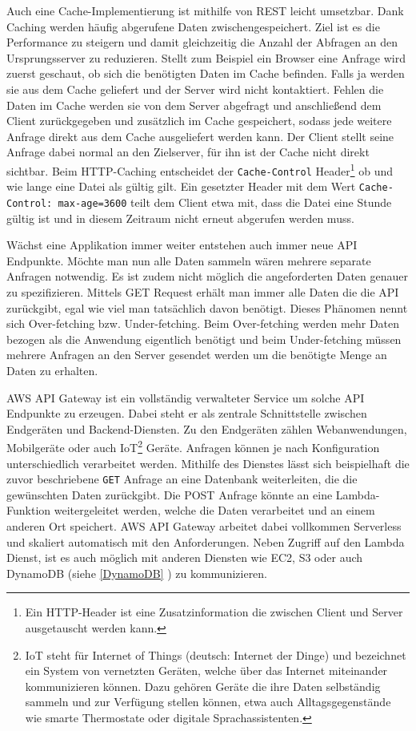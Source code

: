 Auch eine Cache-Implementierung ist mithilfe von REST leicht umsetzbar.
Dank Caching werden häufig abgerufene Daten zwischengespeichert.
Ziel ist es die Performance zu steigern und damit gleichzeitig die Anzahl der Abfragen an den Ursprungsserver zu reduzieren.
Stellt zum Beispiel ein Browser eine Anfrage wird zuerst geschaut, ob sich die benötigten Daten im Cache befinden.
Falls ja werden sie aus dem Cache geliefert und der Server wird nicht kontaktiert.
Fehlen die Daten im Cache werden sie von dem Server abgefragt und anschließend dem Client zurückgegeben und zusätzlich im Cache gespeichert, sodass jede weitere Anfrage direkt aus dem Cache ausgeliefert werden kann.
Der Client stellt seine Anfrage dabei normal an den Zielserver, für ihn ist der Cache nicht direkt sichtbar.
Beim HTTP-Caching entscheidet der \verb+Cache-Control+ Header\footnote{Ein HTTP-Header ist eine Zusatzinformation die zwischen Client und Server ausgetauscht werden kann.} ob und wie lange eine Datei als gültig gilt.
Ein gesetzter Header mit dem Wert \verb+Cache-Control: max-age=3600+ teilt dem Client etwa mit, dass die Datei eine Stunde gültig ist und in diesem Zeitraum nicht erneut abgerufen werden muss. \cite[]{Cache}

Wächst eine Applikation immer weiter entstehen auch immer neue API Endpunkte. Möchte man nun alle Daten sammeln wären mehrere separate Anfragen notwendig.
Es ist zudem nicht möglich die angeforderten Daten genauer zu spezifizieren.
Mittels GET Request erhält man immer alle Daten die die API zurückgibt, egal wie viel man tatsächlich davon benötigt.
Dieses Phänomen nennt sich Over-fetching bzw. Under-fetching.
Beim Over-fetching werden mehr Daten bezogen als die Anwendung eigentlich benötigt und beim Under-fetching müssen mehrere Anfragen an den Server gesendet werden um die benötigte Menge an Daten zu erhalten.\cite[]{API}

AWS API Gateway ist ein vollständig verwalteter Service um solche API Endpunkte zu erzeugen.
Dabei steht er als zentrale Schnittstelle zwischen Endgeräten und Backend-Diensten.
Zu den Endgeräten zählen Webanwendungen, Mobilgeräte oder auch
IoT\footnote{IoT steht für Internet of Things (deutsch: Internet der Dinge) und bezeichnet ein System von vernetzten Geräten, welche
 über das Internet miteinander kommunizieren können. Dazu gehören Geräte die ihre Daten selbständig sammeln und zur Verfügung stellen können,
 etwa auch Alltagsgegenstände wie smarte Thermostate oder digitale Sprachassistenten. } Geräte.
Anfragen können je nach Konfiguration unterschiedlich verarbeitet werden.
Mithilfe des Dienstes lässt sich beispielhaft die zuvor beschriebene \verb+GET+ Anfrage an eine Datenbank weiterleiten, die die gewünschten Daten zurückgibt.
Die POST Anfrage könnte an eine Lambda-Funktion weitergeleitet werden, welche die Daten verarbeitet und an einem anderen Ort speichert.
AWS API Gateway arbeitet dabei vollkommen Serverless und skaliert automatisch mit den Anforderungen. Neben Zugriff auf den Lambda Dienst, ist es auch möglich
mit anderen Diensten wie EC2, S3 oder auch DynamoDB (siehe \ref{DynamoDB} ) zu kommunizieren.

